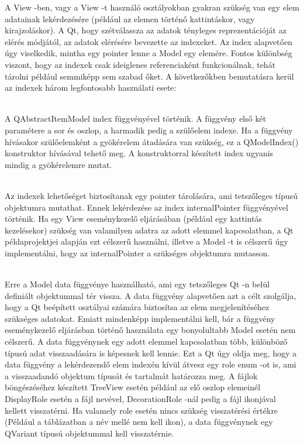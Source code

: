 A View -ben, vagy a View -t használó osztályokban gyakran szükség van 
egy elem adatainak lekérdezésére (például az elemen történő kattintáskor, 
vagy kirajzoláskor). 
A Qt, hogy szétválassza az adatok tényleges reprezentációját az elérés módjától, 
az adatok elérésére bevezette az indexeket. 
Az index alapvetően úgy viselkedik, 
mintha egy pointer lenne a Model egy elemére. 
Fontos különbség viszont, 
hogy az indexek csak ideiglenes referenciaként funkcionálnak, 
tehát tárolni például semmiképp sem szabad őket. 
A következőkben bemutatásra kerül az indexek három legfontosabb használati esete:
\begin{description}[font=\normalfont\itshape\space]
\item [Index lekérdezése egy adott elemhez: ] \hfill \\
A {\ttfamily QAbstractItemModel} {\ttfamily index} függvényével történik. 
A függvény első két paramétere a sor és oszlop, 
a harmadik pedig a szülőelem indexe. 
Ha a függvény hívásakor szülőelemként a gyökérelem átadására van szükség, 
ez a {\ttfamily QModelIndex()} konstruktor hívásával tehető meg. 
A konstruktorral készített index ugyanis mindig a gyökérelemre mutat.
\item [Felhasználói adat lekérdezése az index -től: ] \hfill \\
Az indexek lehetőséget biztosítanak egy pointer tárolására, 
ami tetszőleges típusú objektumra mutathat. 
Ennek lekérdezése az index {\ttfamily internalPointer} függvényével történik. 
Ha egy View eseménykezelő eljárásában (például egy kattintás kezelésekor) 
szükség van valamilyen adatra az adott elemmel kapcsolatban, 
a Qt példaprojektjei alapján ezt célszerű használni, 
illetve a Model -t is célszerű úgy implementálni, 
hogy az {\ttfamily internalPointer} a szükséges objektumra mutasson.
\item [Megjelenítendő adatok lekérdezése index alapján:] \hfill \\
Erre a Model {\ttfamily data} függvénye használható, 
ami egy tetszőleges Qt -n belül definiált objektummal tér vissza. 
A {\ttfamily data} függvény alapvetően azt a célt szolgálja, 
hogy a Qt beépített osztályai számára biztosítsa
az elem megjelenítéséhez szükséges adatokat. 
Emiatt mindenképp implementálni kell, 
bár a függvény eseménykezelő eljárásban történő használata 
egy bonyolultabb Model esetén nem célszerű. 
A {\ttfamily data} függvénynek egy adott elemmel kapcsolatban több, 
különböző típusú adat visszaadására is képesnek kell lennie. 
Ezt a Qt úgy oldja meg, 
hogy a {\ttfamily data} függvény a lekérdezendő elem indexén kívül 
átvesz egy {\ttfamily role} enum -ot is, 
ami a visszaadandó objektum típusát és tartalmát határozza meg. 
A fájlok böngészéséhez készített TreeView esetén például 
az elő oszlop elemeinél {\ttfamily DisplayRole} esetén a fájl nevével, 
{\ttfamily DecorationRole} -nál pedig a fájl
ikonjával kellett visszatérni. 
Ha valamely {\ttfamily role} esetén nincs szükség visszatérési értékre 
(Például a táblázatban a név mellé nem kell ikon), 
a data függvénynek egy {\ttfamily QVariant} típusú objektummal kell visszatérnie. 
\end{description}

